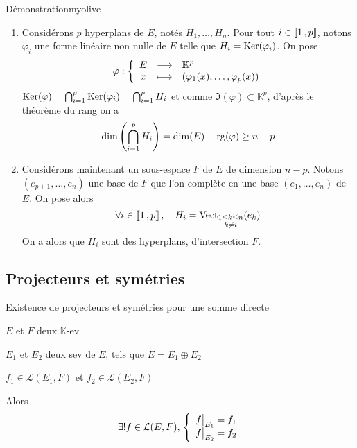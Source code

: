     \begin{demo}{Démonstration}{myolive}
        \begin{enumerate}
            \item Considérons $p$ hyperplans de $E$, notés $H_1,\ldots,H_n$. Pour tout $i \in \left\llbracket 1 \, , p \right\rrbracket$, notons $\varphi_i$ une forme linéaire non nulle de $E$ telle que $H_i = \operatorname{Ker}(\varphi_i)$. On pose 
            \[ \fonction{\varphi}{E}{\mathbb{K}^p}{x}{(\varphi_1(x),\ldots,\varphi_p(x))} \]   
            $\operatorname{Ker}(\varphi) = \bigcap_{i=1}^p \operatorname{Ker}(\varphi_i) = \bigcap_{i=1}^p H_i$ et comme $\Im(\varphi) \subset \mathbb{K}^p$, d’après le théorème du rang on a 
            \[ \dim\left( \bigcap_{i=1}^p H_i \right) = \dim(E) - \operatorname{rg}(\varphi) \geq n-p \]  
            \item Considérons maintenant un sous-espace $F$ de $E$ de dimension $n-p$. Notons $(e_{p+1}, \ldots, e_n)$ une base de $F$ que l’on complète en une base $(e_1,\ldots, e_n)$ de $E$. On pose alors 
            \[ \forall i \in \left\llbracket 1 \, , p \right\rrbracket, \quad H_i = \operatorname{Vect}_{\substack{1 \leq k \leq n \\ k \neq i}} (e_k) \]
            On a alors que $H_i$ sont des hyperplans, d’intersection $F$.
        \end{enumerate}
    \end{demo}

\subsection{Projecteurs et symétries}

    \begin{theo}{Existence de projecteurs et symétries pour une somme directe}{}
        \begin{soient}
            \item $E$ et $F$ deux $\mathbb{K}$-ev
            \item $E_1$ et $E_2$ deux sev de $E$, tels que $E = E_1 \oplus E_2$
            \item $f_1 \in \mathcal{L}(E_1,F)$ et $f_2 \in \mathcal{L}(E_2,F)$
        \end{soient}
        Alors \[ \exists ! f \in \mathcal{L}(E,F), \, \left\{ \begin{array}{l}
        \restr{f}{E_1} = f_1 \\
        \restr{f}{E_2} = f_2
        \end{array} \right. \]
    \end{theo}

